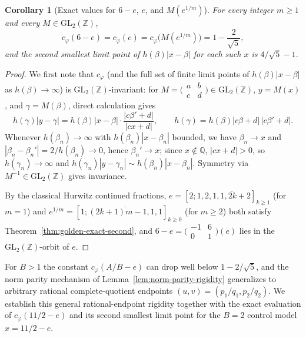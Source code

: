 \documentclass[11pt]{amsart}
\newtheorem{corollary}[theorem]{Corollary}
\theoremstyle{definition}
\theoremstyle{remark}
\numberwithin{equation}{section}
\newcommand{\Q}{\mathbb{Q}}
\newcommand{\Z}{\mathbb{Z}}
\begin{document}
\begin{corollary}[Exact values for $6-e$, $e$, and $M(e^{1/m})$]\label{cor:golden-exact-e}
For every integer $m\ge1$ and every $M\in\mathrm{GL}_2(\Z)$,
\[
 c_\varphi(6-e)=c_\varphi(e)=c_\varphi\bigl(M(e^{1/m})\bigr)=1-\frac{2}{\sqrt5},
\]
and the second smallest limit point of $h(\beta)|x-\beta|$ for each such
$x$ is $4/\sqrt5-1$.
\end{corollary}
\begin{proof}
We first note that $c_\varphi$ (and the full set of finite limit points
of $h(\beta)|x-\beta|$ as $h(\beta)\to\infty$) is $\mathrm{GL}_2(\Z)$-invariant:
for $M=\bigl(\begin{smallmatrix}a&b\\c&d\end{smallmatrix}\bigr)\in\mathrm{GL}_2(\Z)$,
$y=M(x)$, and $\gamma=M(\beta)$, direct calculation gives
\[
 h(\gamma)|y-\gamma|=h(\beta)|x-\beta|\cdot\frac{|c\beta'+d|}{|cx+d|},
 \qquad h(\gamma)=h(\beta)|c\beta+d|\,|c\beta'+d|.
\]
Whenever $h(\beta_n)\to\infty$ with $h(\beta_n)|x-\beta_n|$ bounded, we
have $\beta_n\to x$ and $|\beta_n-\beta_n'|=2/h(\beta_n)\to0$, hence
$\beta_n'\to x$; since $x\notin\Q$, $|cx+d|>0$, so $h(\gamma_n)\to\infty$
and $h(\gamma_n)|y-\gamma_n|\sim h(\beta_n)|x-\beta_n|$. Symmetry via
$M^{-1}\in\mathrm{GL}_2(\Z)$ gives invariance.

By the classical Hurwitz continued fractions,
$e=[2;1,2,\overline{1,1,2k+2}]_{k\ge1}$ (for $m=1$) and
$e^{1/m}=[1;\overline{(2k+1)m-1,1,1}]_{k\ge0}$ (for $m\ge2$) both satisfy
Theorem~\ref{thm:golden-exact-second}, and $6-e=\bigl(\begin{smallmatrix}-1&6\\0&1\end{smallmatrix}\bigr)(e)$
lies in the $\mathrm{GL}_2(\Z)$-orbit of $e$.
\end{proof}

For $B>1$ the constant $c_\varphi(A/B-e)$ can drop well below
$1-2/\sqrt5$, and the norm parity mechanism of
Lemma~\ref{lem:norm-parity-rigidity} generalizes to arbitrary rational
complete-quotient endpoints $(u,v)=(p_1/q_1,p_2/q_2)$. We establish this
general rational-endpoint rigidity together with the exact evaluation of
$c_\varphi(11/2-e)$ and its second smallest limit point for the $B=2$
control model $x=11/2-e$.
\end{document}
